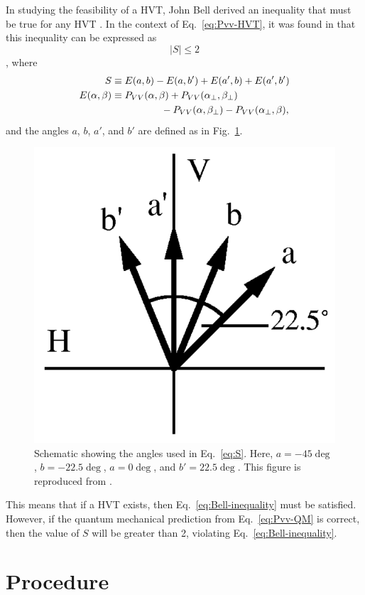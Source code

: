 \documentclass{../paper}
\newcommand{\eq}[1]{Eq.~\eqref{#1}}
\newcommand{\fig}[1]{Fig.~\ref{#1}}
\begin{document}
In studying the feasibility of a HVT, John Bell derived an inequality that must be true for any HVT \cite{Bell1964}. In the context of \eq{eq:Pvv-HVT}, it was found in \cite{Clauser1969} that this inequality can be expressed as
\begin{equation}\label{eq:Bell-inequality}
  |S| \leq 2
\end{equation}
\cite{Dehlinger2002}, where
\begin{align}
  S &\equiv E(a,b) - E(a,b') + E(a',b) + E(a',b') \label{eq:S} \\
  E(\alpha,\beta) &\equiv P_{VV}(\alpha,\beta) + P_{VV}(\alpha_\perp,\beta_\perp) \label{eq:E-inP} \\
                  &\notag \qquad\qquad\quad - P_{VV}(\alpha,\beta_\perp) - P_{VV}(\alpha_\perp,\beta),
\end{align}
and the angles $a$, $b$, $a'$, and $b'$ are defined as in \fig{fig:angles}.

\begin{figure}
  \centering
  \includegraphics[width=0.6\columnwidth]{assets/angles.png}
  \caption{Schematic showing the angles used in \eq{eq:S}. Here, $a = -45\deg$, $b = -22.5\deg$, $a = 0\deg$, and $b' = 22.5\deg$. This figure is reproduced from \cite{Dehlinger2002}.}
  \label{fig:angles}
\end{figure}

This means that if a HVT exists, then \eq{eq:Bell-inequality} must be satisfied. However, if the quantum mechanical prediction from \eq{eq:Pvv-QM} is correct, then the value of $S$ will be greater than 2, violating \eq{eq:Bell-inequality}.

\section{Procedure}
\end{document}
